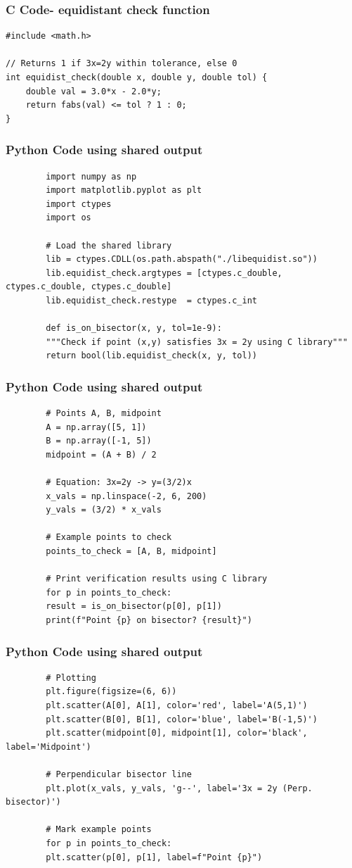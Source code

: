 \documentclass{beamer}
\begin{document}
	\begin{frame}[fragile]
	\frametitle{C Code- equidistant check function }
	
	\begin{lstlisting}
#include <math.h>

// Returns 1 if 3x=2y within tolerance, else 0
int equidist_check(double x, double y, double tol) {
	double val = 3.0*x - 2.0*y;
	return fabs(val) <= tol ? 1 : 0;
}
	\end{lstlisting}
\end{frame}

\begin{frame}[fragile]
	\frametitle{Python Code using shared output}
	\begin{lstlisting}
		import numpy as np
		import matplotlib.pyplot as plt
		import ctypes
		import os
		
		# Load the shared library
		lib = ctypes.CDLL(os.path.abspath("./libequidist.so"))
		lib.equidist_check.argtypes = [ctypes.c_double, ctypes.c_double, ctypes.c_double]
		lib.equidist_check.restype  = ctypes.c_int
		
		def is_on_bisector(x, y, tol=1e-9):
		"""Check if point (x,y) satisfies 3x = 2y using C library"""
		return bool(lib.equidist_check(x, y, tol))
	\end{lstlisting}
\end{frame}
\begin{frame}[fragile]
	\frametitle{Python Code using shared output}
	\begin{lstlisting}		
		# Points A, B, midpoint
		A = np.array([5, 1])
		B = np.array([-1, 5])
		midpoint = (A + B) / 2
		
		# Equation: 3x=2y -> y=(3/2)x
		x_vals = np.linspace(-2, 6, 200)
		y_vals = (3/2) * x_vals
		
		# Example points to check
		points_to_check = [A, B, midpoint]
		
		# Print verification results using C library
		for p in points_to_check:
		result = is_on_bisector(p[0], p[1])
		print(f"Point {p} on bisector? {result}")
	\end{lstlisting}
\end{frame}
\begin{frame}[fragile]
	\frametitle{Python Code using shared output}
	\begin{lstlisting}
		# Plotting
		plt.figure(figsize=(6, 6))
		plt.scatter(A[0], A[1], color='red', label='A(5,1)')
		plt.scatter(B[0], B[1], color='blue', label='B(-1,5)')
		plt.scatter(midpoint[0], midpoint[1], color='black', label='Midpoint')
		
		# Perpendicular bisector line
		plt.plot(x_vals, y_vals, 'g--', label='3x = 2y (Perp. bisector)')
		
		# Mark example points
		for p in points_to_check:
		plt.scatter(p[0], p[1], label=f"Point {p}")
	\end{lstlisting}
\end{frame}
\end{document}
